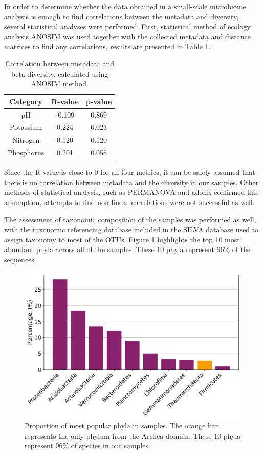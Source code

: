 \documentclass[12pt,twocolumn]{article} %
\begin{document}
\par
In order to determine whether the data obtained in a small-scale microbiome analysis is enough to find correlations between the metadata and diversity, several statistical analyses were performed. First, statistical method of ecology analysis ANOSIM\cite{CLARKE1993} was used together with the collected metadata and distance matrices to find any correlations, results are presented in Table 1.
\begin{table}[ht!] %
	\begin{center}
		\label{tab:table_correlation}
		\begin{tabular}{c|c|c}
			\textbf{Category} & \textbf{R-value} & \textbf{p-value}\\
			\hline
			pH & -0.109 & 0.869\\
			Potassium & 0.224 & 0.023\\
			Nitrogen & 0.120 & 0.120 \\
			Phosphorus & 0.201 & 0.058\\
		\end{tabular}
		\caption{Correlation between metadata and beta-diversity, calculated using ANOSIM\cite{CLARKE1993} method.}
	\end{center}
\end{table}
\par
Since the R-value is close to 0 for all four metrics, it can be safely assumed that there is no correlation between metadata and the diversity in our samples. Other methods of statistical analysis, such as PERMANOVA\cite{Tang2016} and adonis confirmed this assumption, attempts to find non-linear correlations were not successful as well.
\par
The assessment of taxonomic composition of the samples was performed as well, with the taxonomic referencing database included in the SILVA database used to assign taxonomy to most of the OTUs. Figure \ref{fig:top_taxa} highlights the top 10 most abundant phyla across all of the samples. These 10 phyla represent 96\% of the sequences.
\begin{figure}[ht!] %
	\includegraphics[width=\linewidth]{top_10.png}
	\caption{Proportion of most popular phyla in samples. The orange bar represents the only phylum from the Archea domain. These 10 phyla represent 96\% of species in our samples.}
	\label{fig:top_taxa}
\end{figure}
\end{document}
